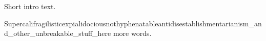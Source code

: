 \documentclass{article}
\begin{document}
Short intro text.

Supercalifragilisticexpialidocious\-nothyphenatable\hbox{antidisestablishmentarianism_and_other_unbreakable_stuff_here} more words.
\end{document}
